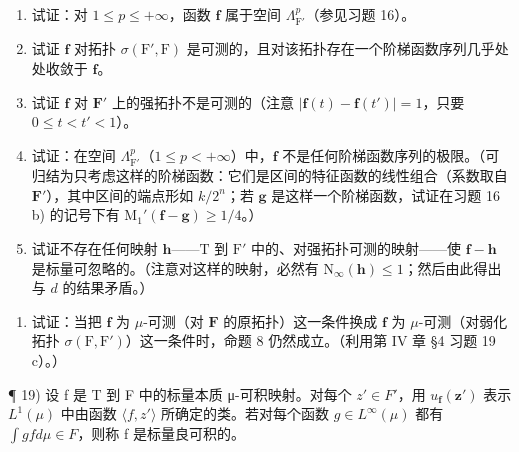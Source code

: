 \begin{enumerate}
\def\labelenumi{\alph{enumi})}
\item
  试证：对 \(1 \leqslant p \leqslant +\infty\)，函数 \(\mathbf{f}\) 属于空间 \(\Lambda_{\mathrm{F}'}^p\)（参见习题 16）。
\item
  试证 \(\mathbf{f}\) 对拓扑 \(\sigma(\mathrm{F}',\mathrm{F})\) 是可测的，且对该拓扑存在一个阶梯函数序列几乎处处收敛于 \(\mathbf{f}\)。
\item
  试证 \(\mathbf{f}\) 对 \(\mathbf{F}'\) 上的强拓扑不是可测的（注意 \(|\mathbf{f}(t) - \mathbf{f}(t')| = 1\)，只要 \(0 \leqslant t < t' < 1\)）。
\item
  试证：在空间 \(\Lambda_{\mathrm{F}'}^p\)（\(1 \leqslant p < +\infty\)）中，\(\mathbf{f}\) 不是任何阶梯函数序列的极限。（可归结为只考虑这样的阶梯函数：它们是区间的特征函数的线性组合（系数取自 \(\mathbf{F}'\)），其中区间的端点形如 \(k/2^n\)；若 \(\mathbf{g}\) 是这样一个阶梯函数，试证在习题 16 b) 的记号下有 \(\mathrm{M}_1'(\mathbf{f} - \mathbf{g}) \geqslant 1/4\)。）
\item
  试证不存在任何映射 \(\mathbf{h}\)——\(\mathrm{T}\) 到 \(\mathrm{F}'\) 中的、对强拓扑可测的映射——使 \(\mathbf{f} - \mathbf{h}\) 是标量可忽略的。（注意对这样的映射，必然有 \(\mathrm{N}_{\infty}(\mathbf{h}) \leqslant 1\)；然后由此得出与 \(d\) 的结果矛盾。）
\end{enumerate}

\begin{enumerate}
\def\labelenumi{\arabic{enumi})}
\setcounter{enumi}{17}
\tightlist
\item
  试证：当把 \(\mathbf{f}\) 为 \(\mu\)-可测（对 \(\mathbf{F}\) 的原拓扑）这一条件换成 \(\mathbf{f}\) 为 \(\mu\)-可测（对弱化拓扑 \(\sigma(\mathrm{F},\mathrm{F}')\)）这一条件时，命题 8 仍然成立。（利用第 IV 章 §4 习题 19 c）。）
\end{enumerate}

¶ 19) 设 f 是 T 到 F 中的标量本质 μ-可积映射。对每个 \(z' \in F'\)，用 \(u_{\mathbf{f}}(\mathbf{z}')\) 表示 \(L^{1}(\mu)\) 中由函数 \(\langle f, z' \rangle\) 所确定的类。若对每个函数 \(g \in L^{\infty}(\mu)\) 都有 \(\int g f d\mu \in F\)，则称 f 是标量良可积的。

